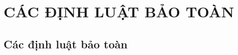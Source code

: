 \documentclass[DONG_CHAY_NEN_DUOC.tex]{subfiles}
\begin{document}
\chapter{CÁC ĐỊNH LUẬT BẢO TOÀN}

\section{Các định luật bảo toàn}



\end{document}

